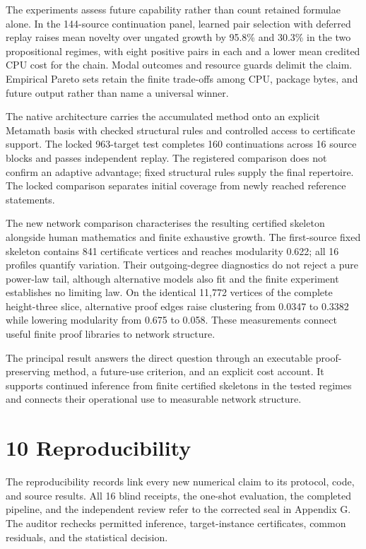 \documentclass[pdflatex,sn-basic,Numbered]{sn-jnl}
\begin{document}
The experiments assess future capability rather than count retained formulae alone. In the 144-source continuation panel, learned pair selection with deferred replay raises mean novelty over ungated growth by 95.8\% and 30.3\% in the two propositional regimes, with eight positive pairs in each and a lower mean credited CPU cost for the chain. Modal outcomes and resource guards delimit the claim. Empirical Pareto sets retain the finite trade-offs among CPU, package bytes, and future output rather than name a universal winner.

The native architecture carries the accumulated method onto an explicit Metamath basis with checked structural rules and controlled access to certificate support. The locked 963-target test completes 160 continuations across 16 source blocks and passes independent replay. The registered comparison does not confirm an adaptive advantage; fixed structural rules supply the final repertoire. The locked comparison separates initial coverage from newly reached reference statements.

The new network comparison characterises the resulting certified skeleton alongside human mathematics and finite exhaustive growth. The first-source fixed skeleton contains 841 certificate vertices and reaches modularity 0.622; all 16 profiles quantify variation. Their outgoing-degree diagnostics do not reject a pure power-law tail, although alternative models also fit and the finite experiment establishes no limiting law. On the identical 11,772 vertices of the complete height-three slice, alternative proof edges raise clustering from 0.0347 to 0.3382 while lowering modularity from 0.675 to 0.058. These measurements connect useful finite proof libraries to network structure.

The principal result answers the direct question through an executable proof-preserving method, a future-use criterion, and an explicit cost account. It supports continued inference from finite certified skeletons in the tested regimes and connects their operational use to measurable network structure. 

\section*{10 Reproducibility}\label{reproducibility}

The reproducibility records link every new numerical claim to its protocol, code, and source results. All 16 blind receipts, the one-shot evaluation, the completed pipeline, and the independent review refer to the corrected seal in Appendix G. The auditor rechecks permitted inference, target-instance certificates, common residuals, and the statistical decision. 
\end{document}
